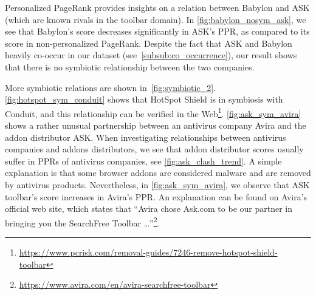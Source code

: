\documentclass[ijoc,nonblindrev]{informs3} %
\numberwithin{equation}{subsection}
\begin{document}
Personalized PageRank provides insights on a relation between Babylon and ASK (which are known rivals in the toolbar domain). In \autoref{fig:babylon_nosym_ask}, we see that Babylon's score decreases significantly in ASK's PPR, as compared to its score in non-personalized PageRank. Despite the fact that ASK and Babylon heavily co-occur in our dataset (see~\autoref{subsub:co_occurrence}), our result shows that there is no symbiotic relationship between the two companies. 

More symbiotic relations are shown in~\autoref{fig:symbiotic_2}. \autoref{fig:hotspot_sym_conduit} shows that HotSpot Shield is in symbiosis with Conduit, and this relationship can be verified in the Web\footnote{\url{https://www.pcrisk.com/removal-guides/7246-remove-hotspot-shield-toolbar}}. \autoref{fig:ask_sym_avira} shows a rather unusual partnership between an antivirus company Avira and the addon distributor ASK. When investigating relationships between antivirus companies and addons distributors, we see that addon distributor scores usually suffer in PPRs of antivirus companies, see \autoref{fig:ask_clash_trend}. A simple explanation is that some browser addons are considered malware and are removed by antivirus products. Nevertheless, in \autoref{fig:ask_sym_avira}, we observe that ASK toolbar's score increases in Avira's PPR. An explanation can be found on Avira's official web site, which states that ``Avira chose Ask.com to be our partner in bringing you the SearchFree Toolbar \dots''\footnote{\label{avira_ask}\url{https://www.avira.com/en/avira-searchfree-toolbar}}. 
\end{document}
